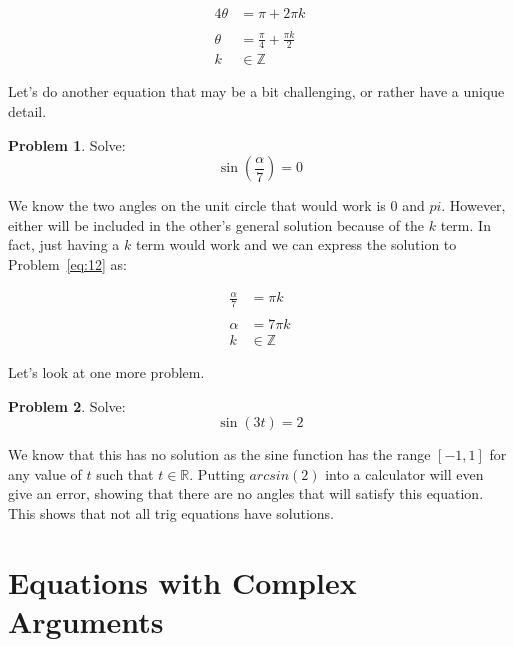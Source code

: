 \documentclass[12pt]{article}
\theoremstyle{definition}
\newtheorem{problem}{Problem}
\begin{document}
\begin{align}
    4\theta & = \pi + 2\pi k                    \\
    \nonumber                                   \\
    \theta  & = \frac{\pi}{4} + \frac{\pi k}{2} \\
    k       & \in \mathbb{Z}
\end{align}

Let's do another equation that may be a bit challenging, or rather have a unique detail.

\begin{problem}
Solve:
\begin{equation*}
    \sin\left(\frac{\alpha}{7}\right) = 0 \label{eq:12}
\end{equation*}
\end{problem}

We know the two angles on the unit circle that would work is $0$ and $pi$.
However, either will be included in the other's general solution because of the $k$ term.
In fact, just having a $k$ term would work and we can express the solution to Problem~\eqref{eq:12} as:

\begin{align}
    \frac{\alpha}{7} & = \pi k        \\
    \nonumber                         \\
    \alpha           & = 7\pi k       \\
    k                & \in \mathbb{Z}
\end{align}

Let's look at one more problem.

\begin{problem}
Solve:
\begin{equation*}
    \sin(3t) = 2 \label{eq:13}
\end{equation*}
\end{problem}

We know that this has no solution as the sine function has the range $[-1, 1]$ for any value of $t$ such that $t \in \mathbb{R}$.
Putting $arcsin(2)$ into a calculator will even give an error, showing that there are no angles that will satisfy this equation.
This shows that not all trig equations have solutions.

\section{Equations with Complex Arguments}
\end{document}

